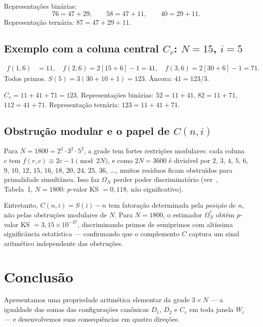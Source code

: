 \documentclass[12pt, a4paper]{article}
\begin{document}
	Representações binárias:
	\[
	76=47+29,\qquad 58=47+11,\qquad 40=29+11.
	\]
	Representação ternária: $87=47+29+11$.\checkmark
	
	\subsection{Exemplo com a coluna central $C_v$: $N=15$, $i=5$}
	
	\begin{align*}
		f(1,6) &= 11,\quad f(2,6)=2[15+6]-1=41,\quad f(3,6)=2[30+6]-1=71.
	\end{align*}
	Todos primos. $S(5)=3(30+10+1)=123$. Âncora: $41=123/3$.\checkmark
	
	$C_v=11+41+71=123$. Representações binárias: $52=11+41$, $82=11+71$,
	$112=41+71$. Representação ternária: $123=11+41+71$.\checkmark
	
	\subsection{Obstrução modular e o papel de $C(n,i)$}
	
	Para $N=1800=2^3\cdot 3^2\cdot 5^2$, a grade tem fortes restrições modulares:
	cada coluna $c$ tem $f(r,c)\equiv 2c-1\pmod{2N}$, e como $2N=3600$ é divisível
	por $2$, $3$, $4$, $5$, $6$, $9$, $10$, $12$, $15$, $16$, $18$, $20$, $24$, $25$,
	$36$, $\dots$, muitos resíduos ficam obstruídos para primalidade simultânea.
	Isso faz $\Omega_N$ perder poder discriminatório (ver~\cite{bandeira2026c},
	Tabela~1, $N=1800$: $p$-valor KS $=0{,}118$, não significativo).
	
	Entretanto, $C(n,i)=S(i)-n$ tem fatoração determinada pela \emph{posição} de $n$,
	não pelas obstruções modulares de $N$. Para $N=1800$, o estimador $\Omega^*_N$
	obtém $p$-valor KS $=3{,}15\times 10^{-47}$, discriminando primos de semiprimos
	com altíssima significância estatística — confirmando que o complemento $C$ captura
	um sinal aritmético independente das obstruções.
	
	\section{Conclusão}
	\label{sec:conclusao}
	
	Apresentamos uma propriedade aritmética elementar da grade $3\times N$ — a
	igualdade das somas das configurações canônicas $D_1$, $D_2$ e $C_v$ em toda
	janela $W_i$ — e desenvolvemos suas consequências em quatro direções.
	
\end{document}
